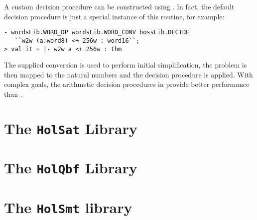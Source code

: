 A custom decision procedure can be constructed using .  In fact, the default decision procedure is just a special instance of this routine, for example:
\begin{session}
\begin{verbatim}
- wordsLib.WORD_DP wordsLib.WORD_CONV bossLib.DECIDE
   ``w2w (a:word8) <+ 256w : word16``;
> val it = |- w2w a <+ 256w : thm
\end{verbatim}
\end{session}
The supplied conversion is used to perform initial simplification, the problem is then mapped to the natural numbers and the decision procedure is applied.  With complex goals, the arithmetic decision procedures in  provide better performance than .


\section{The \texttt{HolSat} Library}\label{sec:HolSatLib}



\section{The \texttt{HolQbf} Library}\label{sec:HolQbfLib}



\section{The \texttt{HolSmt} library}\label{sec:HolSmtLib}



